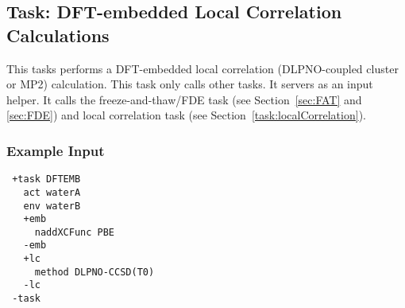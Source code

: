 \subsection{Task: DFT-embedded Local Correlation Calculations}
This tasks performs a DFT-embedded local correlation (DLPNO-coupled cluster or MP2) calculation.
This task only calls other tasks. It servers as an input helper. It calls the freeze-and-thaw/FDE task
(see Section~\ref{sec:FAT} and \ref{sec:FDE}) and local correlation task
(see Section~\ref{task:localCorrelation}).
\subsubsection{Example Input}
\begin{lstlisting}
 +task DFTEMB
   act waterA
   env waterB
   +emb
     naddXCFunc PBE
   -emb
   +lc
     method DLPNO-CCSD(T0)
   -lc
 -task
\end{lstlisting}
